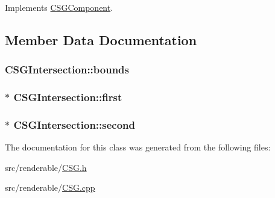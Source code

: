 Implements \hyperlink{classCSGComponent_a4299365f2bab69272af9de4f2bee7cdb}{C\+S\+G\+Component}.



\subsection{Member Data Documentation}
\subsubsection[{\texorpdfstring{bounds}{bounds}}]{ C\+S\+G\+Intersection\+::bounds\hspace{0.3cm}{\ttfamily [private]}}\hypertarget{classCSGIntersection_a25fb136c5dcda3e15357b6c1abb1c2e2}{}\label{classCSGIntersection_a25fb136c5dcda3e15357b6c1abb1c2e2}
\subsubsection[{\texorpdfstring{first}{first}}]{$\ast$ C\+S\+G\+Intersection\+::first\hspace{0.3cm}{\ttfamily [private]}}\hypertarget{classCSGIntersection_af9619c91599eb3f81342000284e0f1c6}{}\label{classCSGIntersection_af9619c91599eb3f81342000284e0f1c6}
\subsubsection[{\texorpdfstring{second}{second}}]{$\ast$ C\+S\+G\+Intersection\+::second\hspace{0.3cm}{\ttfamily [private]}}\hypertarget{classCSGIntersection_a71b90fe1c487c4cc5fce0614f503e29c}{}\label{classCSGIntersection_a71b90fe1c487c4cc5fce0614f503e29c}


The documentation for this class was generated from the following files\+:\begin{DoxyCompactItemize}
\item 
src/renderable/\hyperlink{CSG_8h}{C\+S\+G.\+h}\item 
src/renderable/\hyperlink{CSG_8cpp}{C\+S\+G.\+cpp}\end{DoxyCompactItemize}
